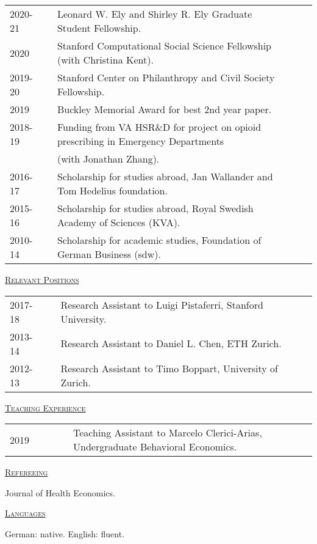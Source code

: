 \documentclass[letterpaper,11pt]{article}
\begin{document}
\begin{tabular}{@{}l@{}cl@{}cl}
2020-21 & & Leonard W. Ely and Shirley R. Ely Graduate Student Fellowship. \\
2020 & & Stanford Computational Social Science Fellowship (with Christina Kent). \\
2019-20 & & Stanford Center on Philanthropy and Civil Society Fellowship. \\
2019 & & Buckley Memorial Award for best 2nd year paper. \\
2018-19 & & Funding from VA HSR\&D for project on opioid prescribing in Emergency Departments \\ & & (with Jonathan Zhang). \\
2016-17 & & Scholarship for studies abroad, Jan Wallander and Tom Hedelius foundation. \\
2015-16 & & Scholarship for studies abroad, Royal Swedish Academy of Sciences (KVA).  \\
2010-14 & & Scholarship for academic studies, Foundation of German Business (sdw).
\end{tabular}
 
 \bigskip
 
\underline {\textsc{Relevant Positions}}

\begin{tabular}{@{}l@{}cl@{}cl}
2017-18 & & Research Assistant to Luigi Pistaferri, Stanford University. \\
2013-14 & & Research Assistant to Daniel L. Chen, ETH Zurich. \\
2012-13 & & Research Assistant to Timo Boppart, University of Zurich.
\end{tabular}

\bigskip
 
\underline {\textsc{Teaching Experience}}

\begin{tabular}{@{}l@{}cl@{}cl}
2019 & \ \ \ \ \ & Teaching Assistant to Marcelo Clerici-Arias, Undergraduate Behavioral Economics.
\end{tabular}

\bigskip
 
\underline {\textsc{Refereeing}}

Journal of Health Economics.

\bigskip
 
\underline {\textsc{Languages}}

German: native. English: fluent.
\end{document}
